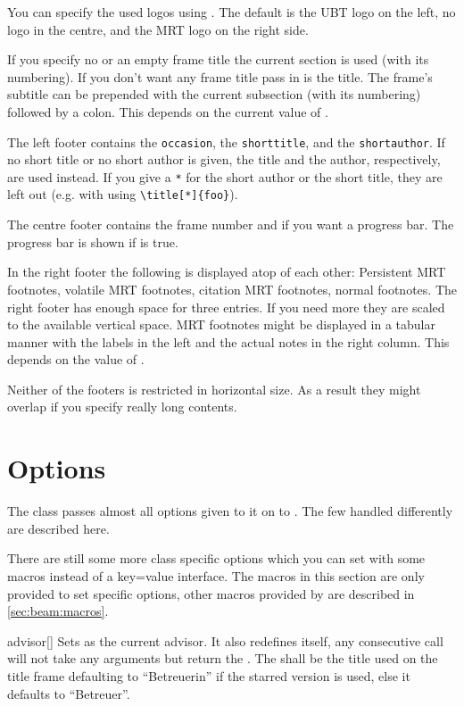 You can specify the used logos using . The default is the UBT logo
on the left, no logo in the centre, and the MRT logo on the right side.

If you specify no or an empty frame title the current section is used (with its
numbering). If you don't want any frame title pass in  is the title.
The frame's subtitle can be prepended with the current subsection (with its
numbering) followed by a colon. This depends on the current value of
.

The left footer contains the \texttt{occasion}, the \texttt{shorttitle}, and the
\texttt{shortauthor}. If no short title or no short author is given, the title
and the author, respectively, are used instead. If you give a \texttt{*} for the
short author or the short title, they are left out (e.g. with using
\verb|\title[*]{foo}|).

The centre footer contains the frame number and if you want a progress bar. The
progress bar is shown if  is true.

In the right footer the following is displayed atop of each other: Persistent
MRT footnotes, volatile MRT footnotes, citation MRT footnotes, normal footnotes.
The right footer has enough space for three entries. If you need more they are
scaled to the available vertical space. MRT footnotes might be displayed in a
tabular manner with the labels in the left and the actual notes in the right
column. This depends on the value of .

Neither of the footers is restricted in horizontal size. As a result they might
overlap if you specify really long contents.

\section{Options}
The class passes almost all options given to it on to . The few
handled differently are described here.



There are still some more class specific options which you can set with some
macros instead of a key=value interface. The macros in this section are only
provided to set specific options, other macros provided by  are
described in \autoref{sec:beam:macros}.

\begin{describemacro}{advisor}[\meta{*}]
  Sets  as the current advisor. It also redefines itself, any
  consecutive call will not take any arguments but return the . The
   shall be the title used on the title frame defaulting to
  \enquote{Betreuerin} if the starred version is used, else it defaults to
  \enquote{Betreuer}.
\end{describemacro}

